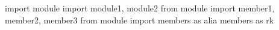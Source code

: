 import module
import module1, module2
from module import member1, member2, member3
from module import members as alia
                   members as rk